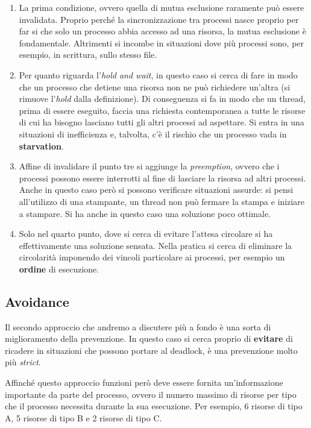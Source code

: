 \begin{enumerate}
    \item La prima condizione, ovvero quella di mutua esclusione raramente può essere invalidata. Proprio perché la sincronizzazione tra processi nasce proprio per far si che solo un processo abbia accesso ad una risorsa, la mutua esclusione è fondamentale. Altrimenti si incombe in situazioni dove più processi sono, per esempio, in scrittura, sullo stesso file.
    
    \item Per quanto riguarda l'\textit{hold and wait}, in questo caso si cerca di fare in modo che un processo che detiene una risorsa non ne può richiedere un'altra (si rimuove l'\textit{hold} dalla definizione). Di conseguenza si fa in modo che un thread, prima di essere eseguito, faccia una richiesta contemporanea a tutte le risorse di cui ha bisogno lasciano tutti gli altri processi ad aspettare. Si entra in una situazioni di inefficienza e, talvolta, c'è il rischio che un processo vada in \textbf{starvation}.

    \item Affine di invalidare il punto tre si aggiunge la \textit{preemption}, ovvero che i processi possono essere interrotti al fine di lasciare la risorsa ad altri processi. Anche in questo caso però si possono verificare situazioni assurde: si pensi all'utilizzo di una stampante, un thread non può fermare la stampa e iniziare a stampare. Si ha anche in questo caso una soluzione poco ottimale.

    \item Solo nel quarto punto, dove si cerca di evitare l'attesa circolare si ha effettivamente una soluzione sensata. Nella pratica si cerca di eliminare la circolarità imponendo dei vincoli particolare ai processi, per esempio un \textbf{ordine} di esecuzione. 
\end{enumerate}

% 
\subsection{Avoidance}\label{avoidance}
Il secondo approccio che andremo a discutere più a fondo è una sorta di miglioramento della prevenzione. In questo caso si cerca proprio di \textbf{evitare} di ricadere in situazioni che possono portare al deadlock, è una prevenzione molto più \textit{strict}.

Affinché questo approccio funzioni però deve essere fornita un'informazione importante da parte del processo, ovvero il numero massimo di risorse per tipo che il processo necessita durante la sua esecuzione. Per esempio, 6 risorse di tipo A, 5 risorse di tipo B e 2 risorse di tipo C.

